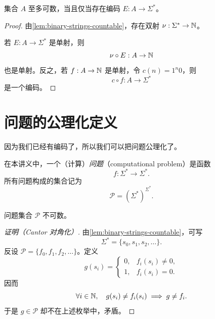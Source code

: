 \begin{theorem}[可编码性与可数性]
  \label{thm:encodable-iff-countable}
  集合 $A$ 至多可数，当且仅当存在编码 $E:A\to\Sigma^*$。
\end{theorem}

\begin{proof}
  由\cref{lem:binary-strings-countable}，存在双射
  $\nu:\Sigma^*\to\mathbb{N}$。

  若 $E:A\to\Sigma^*$ 是单射，则
  \[
    \nu\circ E:A\to\mathbb{N}
  \]
  也是单射。反之，若 $f:A\to\mathbb{N}$ 是单射，令 $c(n)=1^n0$，则
  \[
    c\circ f:A\to\Sigma^*
  \]
  是一个编码。
\end{proof}

\section{问题的公理化定义}

因为我们已经有编码了，所以我们可以把问题公理化了。

\begin{definition}[问题]
  \label{def:problem}
  在本讲义中，一个（计算）\emph{问题}（computational problem）是函数
  \[
    f:\Sigma^*\longrightarrow\Sigma^*.
  \]
  所有问题构成的集合记为
  \[
    \mathcal{P}=(\Sigma^*)^{\Sigma^*}.
  \]
\end{definition}

\begin{theorem}
  \label{thm:problems-uncountable}
  问题集合 $\mathcal{P}$ 不可数。
\end{theorem}

\begin{proof}[证明（Cantor 对角化）]
  由\cref{lem:binary-strings-countable}，可写
  \[
    \Sigma^*=\{s_0,s_1,s_2,\ldots\}.
  \]
  反设 $\mathcal P=\{f_0,f_1,f_2,\ldots\}$。定义
  \[
    g(s_i)=
    \begin{cases}
      0, & f_i(s_i)\neq 0,\\
      1, & f_i(s_i)=0.
    \end{cases}
  \]
  因而
  \[
    \forall i\in\mathbb{N},\quad g(s_i)\neq f_i(s_i)
    \implies g\neq f_i.
  \]
  于是 $g\in\mathcal P$ 却不在上述枚举中，矛盾。
\end{proof}
